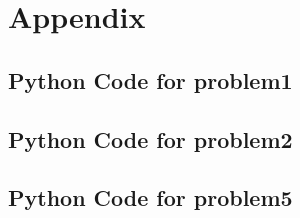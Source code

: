 \section{Appendix}
\subsection{Python Code for problem1}


\subsection{Python Code for problem2}


\subsection{Python Code for problem5}

